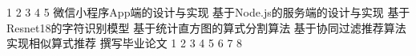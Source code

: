 \assignReq
{1}
{2}
{3}
{4}
{5}
\assignWork
{微信小程序App端的设计与实现}
{基于Node.js的服务端的设计与实现}
{基于Resnet18的字符识别模型}
{基于统计直方图的算式分割算法}
{基于协同过滤推荐算法实现相似算式推荐}
{撰写毕业论文}
\assignRef
{1}
{2}
{3}
{4}
{5}
{6}
{7}
{8}